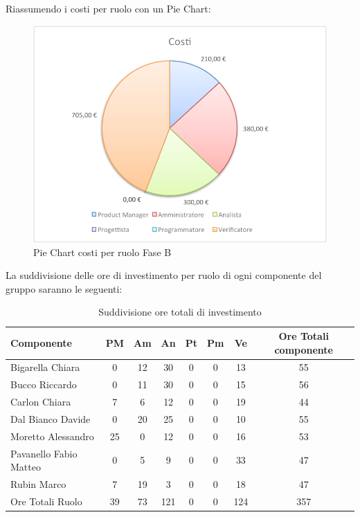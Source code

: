 				Riassumendo i costi per ruolo con un Pie Chart:
				\begin{figure}[H]\centering
					\includegraphics[width=\textwidth]{PianoDiProgetto/Pics/ChartTotCostiFaseB.pdf}
					\caption{Pie Chart costi per ruolo Fase B}
				\end{figure}		
				La suddivisione delle ore di investimento per ruolo di ogni componente del gruppo \groupname{} saranno le seguenti:
				\begin{table}[H]
					\begin{center}
						\begin{tabular}{| l | c | c | c | c | c | c | c |}
							\hline
							Componente 					& PM	& Am 		& An 		& Pt 	& Pm 	& Ve 		& Ore Totali componente \\ \hline
							
							Bigarella Chiara 			& 0		& 12 		& 30 		& 0		& 0		& 13 		& 55 \\
							Bucco Riccardo 				& 0		& 11 		& 30 		& 0		& 0		& 15 		& 56 \\
							Carlon Chiara	 			& 7 	& 6 		& 12 		& 0		& 0		& 19 		& 44 \\
							Dal Bianco Davide 			& 0		& 20 		& 25 		& 0		& 0		& 10 		& 55 \\
							Moretto Alessandro 			& 25 	& 0			& 12 		& 0		& 0		& 16 		& 53 \\
							Pavanello Fabio Matteo	 	& 0		& 5 		& 9 		& 0		& 0		& 33 		& 47 \\
							Rubin Marco					& 7 	& 19 		& 3 		& 0		& 0		& 18 		& 47 \\ \hline \hline
							
							Ore Totali Ruolo 			& 39 	& 73 		& 121	 	& 0		& 0		& 124 		& 357\\ \hline
						\end{tabular}
					\end{center}
					\caption{Suddivisione ore totali di investimento}
				\end{table}
